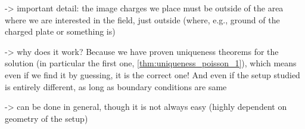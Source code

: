 \documentclass[../class_mech_main.tex]{subfiles}
\begin{document}
-> important detail: the image charges we place must be outside of the area where we are interested in the field, just outside (where, e.g., ground of the charged plate or something is)

-> why does it work? Because we have proven uniqueness theorems for the solution (in particular the first one, \ref{thm:uniqueness_poisson_1}), which means even if we find it by guessing, it is the correct one! And even if the setup studied is entirely different, as long as boundary conditions are same

-> can be done in general, though it is not always easy (highly dependent on geometry of the setup)

\end{document}
